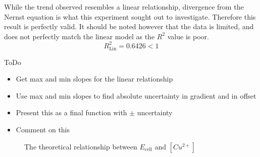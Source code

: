 \documentclass[11pt,a4paper]{article}
\begin{document}
While the trend observed resembles a linear relationship, divergence from the Nernst equation is what this experiment sought out to investigate. Therefore this result is perfectly valid. It should be noted however that the data is limited, and does not perfectly match the linear model as the $R^2$ value is poor.
$$R^2_\textrm{Lin}=0.6426<1$$


ToDo
\begin{itemize}
	\item Get max and min slopes for the linear relationship 
	\item Use max and min slopes to find absolute uncertainty in gradient and in offset
	\item Present this as a final function with $\pm$ uncertainty
	\item Comment on this
\end{itemize}



\begin{figure}
	
	\centering
	
	
	\caption{The theoretical relationship between $E_{\textrm{cell}}$ and $[Cu^{2+}]$}
	\label{ogLog}
\end{figure}
\end{document}
